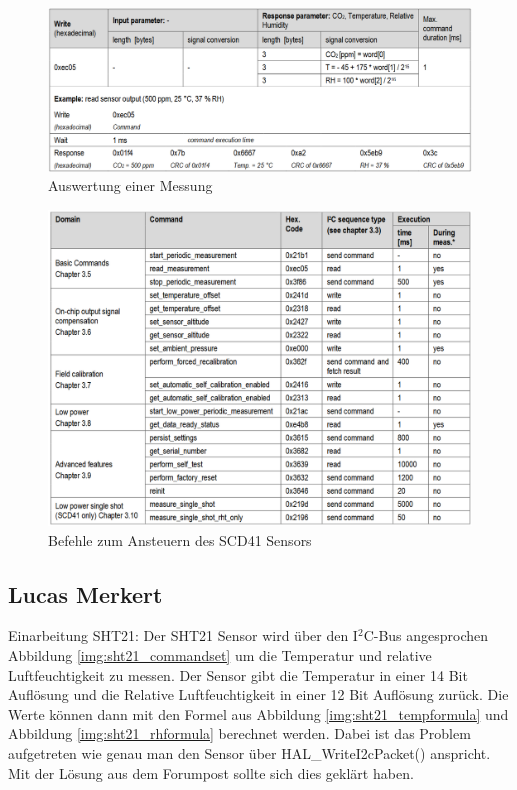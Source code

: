 \documentclass[]{article}
\begin{document}
\begin{figure}[!h]
	\centering
	\includegraphics[scale=0.40]{images/scd41_umrechnung}
	\caption{Auswertung einer Messung ~\cite{datasheetscd41}}
	\label{img:scd41_umrechnung}
\end{figure}
\begin{figure}[!h]
	\centering
	\includegraphics[scale=0.40]{images/scd41_commandset}
	\caption{Befehle zum Ansteuern des SCD41 Sensors~\cite{datasheetsht21}}
	\label{img:scd41_commandset}
\end{figure}

\subsection{Lucas Merkert}
\label{lucas}
Einarbeitung SHT21: Der SHT21 Sensor wird über den I$^2$C-Bus angesprochen {Abbildung \ref{img:sht21_commandset}} um die Temperatur und relative Luftfeuchtigkeit zu messen. Der Sensor gibt die Temperatur in einer 14 Bit Auflösung und die Relative Luftfeuchtigkeit in einer 12 Bit Auflösung zurück. Die Werte können dann mit den Formel aus {Abbildung \ref{img:sht21_tempformula}} und {Abbildung \ref{img:sht21_rhformula}} berechnet werden. Dabei ist das Problem aufgetreten wie genau man den Sensor über HAL\_WriteI2cPacket() anspricht. Mit der Lösung aus dem Forumpost sollte sich dies geklärt haben.
\end{document}
